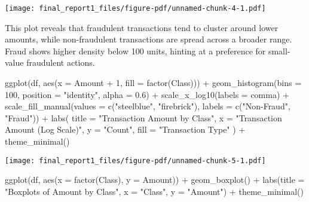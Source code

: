 \documentclass[
  11pt,
  letterpaper,
  DIV=11,
  numbers=noendperiod]{scrartcl}
\newenvironment{Shaded}{}{}
\newcommand{\AttributeTok}[1]{\textcolor[rgb]{0.84,0.23,0.29}{#1}}
\newcommand{\DecValTok}[1]{\textcolor[rgb]{0.00,0.36,0.77}{#1}}
\newcommand{\FloatTok}[1]{\textcolor[rgb]{0.00,0.36,0.77}{#1}}
\newcommand{\FunctionTok}[1]{\textcolor[rgb]{0.44,0.26,0.76}{#1}}
\newcommand{\NormalTok}[1]{\textcolor[rgb]{0.14,0.16,0.18}{#1}}
\newcommand{\SpecialCharTok}[1]{\textcolor[rgb]{0.00,0.36,0.77}{#1}}
\newcommand{\StringTok}[1]{\textcolor[rgb]{0.01,0.18,0.38}{#1}}
\begin{document}
\texttt{[image: final\_report1\_files/figure-pdf/unnamed-chunk-4-1.pdf]}

This plot reveals that fraudulent transactions tend to cluster around
lower amounts, while non-fraudulent transactions are spread across a
broader range. Fraud shows higher density below 100 units, hinting at a
preference for small-value fraudulent actions.

\begin{Shaded}
\begin{Highlighting}[]
\FunctionTok{ggplot}\NormalTok{(df, }\FunctionTok{aes}\NormalTok{(}\AttributeTok{x =}\NormalTok{ Amount }\SpecialCharTok{+} \DecValTok{1}\NormalTok{, }\AttributeTok{fill =} \FunctionTok{factor}\NormalTok{(Class))) }\SpecialCharTok{+}
  \FunctionTok{geom\_histogram}\NormalTok{(}\AttributeTok{bins =} \DecValTok{100}\NormalTok{, }\AttributeTok{position =} \StringTok{"identity"}\NormalTok{, }\AttributeTok{alpha =} \FloatTok{0.6}\NormalTok{) }\SpecialCharTok{+}
  \FunctionTok{scale\_x\_log10}\NormalTok{(}\AttributeTok{labels =}\NormalTok{ comma) }\SpecialCharTok{+}
  \FunctionTok{scale\_fill\_manual}\NormalTok{(}\AttributeTok{values =} \FunctionTok{c}\NormalTok{(}\StringTok{"steelblue"}\NormalTok{, }\StringTok{"firebrick"}\NormalTok{), }\AttributeTok{labels =} \FunctionTok{c}\NormalTok{(}\StringTok{"Non{-}Fraud"}\NormalTok{, }\StringTok{"Fraud"}\NormalTok{)) }\SpecialCharTok{+}
  \FunctionTok{labs}\NormalTok{(}
    \AttributeTok{title =} \StringTok{"Transaction Amount by Class"}\NormalTok{,}
    \AttributeTok{x =} \StringTok{"Transaction Amount (Log Scale)"}\NormalTok{,}
    \AttributeTok{y =} \StringTok{"Count"}\NormalTok{,}
    \AttributeTok{fill =} \StringTok{"Transaction Type"}
\NormalTok{  ) }\SpecialCharTok{+}
  \FunctionTok{theme\_minimal}\NormalTok{()}
\end{Highlighting}
\end{Shaded}

\texttt{[image: final\_report1\_files/figure-pdf/unnamed-chunk-5-1.pdf]}

\begin{Shaded}
\begin{Highlighting}[]
\FunctionTok{ggplot}\NormalTok{(df, }\FunctionTok{aes}\NormalTok{(}\AttributeTok{x =} \FunctionTok{factor}\NormalTok{(Class), }\AttributeTok{y =}\NormalTok{ Amount)) }\SpecialCharTok{+}
  \FunctionTok{geom\_boxplot}\NormalTok{() }\SpecialCharTok{+}
  \FunctionTok{labs}\NormalTok{(}\AttributeTok{title =} \StringTok{"Boxplots of Amount by Class"}\NormalTok{,}
       \AttributeTok{x =} \StringTok{"Class"}\NormalTok{,}
       \AttributeTok{y =} \StringTok{"Amount"}\NormalTok{) }\SpecialCharTok{+}
  \FunctionTok{theme\_minimal}\NormalTok{()}
\end{Highlighting}
\end{Shaded}
\end{document}
